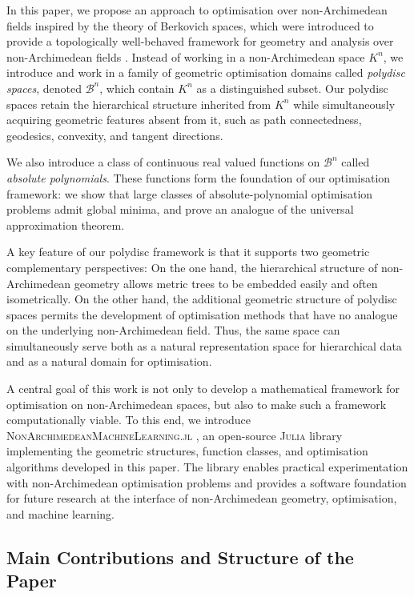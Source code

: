 \documentclass[10pt]{article}
\theoremstyle{definition}
\begin{document}
In this paper, we propose an approach to optimisation over non-Archimedean fields inspired by the theory of Berkovich spaces, which were introduced to provide a topologically well-behaved framework for geometry and analysis over non-Archimedean fields \cite{Berkovich90}.  Instead of working in a non-Archimedean space $K^n$, we introduce and work in a family of geometric optimisation domains called \emph{polydisc spaces}, denoted $\mathcal B^n$, which contain $K^n$ as a distinguished subset.  Our polydisc spaces retain the hierarchical structure inherited from $K^n$ while simultaneously acquiring geometric features absent from it, such as path connectedness, geodesics, convexity, and tangent directions.  

We also introduce a class of continuous real valued functions on $\mathcal B^n$ called \emph{absolute polynomials}.  These functions form the foundation of our optimisation framework: we show that large classes of absolute-polynomial optimisation problems admit global minima, and prove an analogue of the universal approximation theorem.

A key feature of our polydisc framework is that it supports two geometric complementary perspectives: On the one hand, the hierarchical structure of non-Archimedean geometry allows metric trees to be embedded easily and often isometrically.  On the other hand, the additional geometric structure of polydisc spaces permits the development of optimisation methods that have no analogue on the underlying non-Archimedean field.  Thus, the same space can simultaneously serve both as a natural representation space for hierarchical data and as a natural domain for optimisation.

A central goal of this work is not only to develop a mathematical framework for optimisation on non-Archimedean spaces, but also to make such a framework computationally viable. To this end, we introduce \textsc{NonArchimedeanMachineLearning.jl} \cite{NAML}, an open-source \textsc{Julia} \cite{Julia} library implementing the geometric structures, function classes, and optimisation algorithms developed in this paper. The library enables practical experimentation with non-Archimedean optimisation problems and provides a software foundation for future research at the interface of non-Archimedean geometry, optimisation, and machine learning.

\subsection{Main Contributions and Structure of the Paper}
\end{document}
